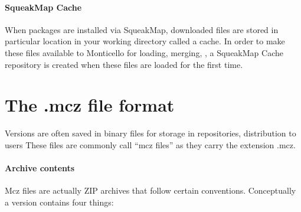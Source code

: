 \documentclass[a4paper,10pt,twoside]{book}
\begin{document}
\paragraph{SqueakMap Cache} When packages are installed via SqueakMap, downloaded files are stored in particular location  in your working directory called a cache. In order to make these files available to Monticello for loading, merging, \etc, a SqueakMap Cache repository is created when these files are loaded for the first time.





\section{The .mcz file format}

Versions are often  saved in binary files for storage in repositories, distribution to users \etc
These files are commonly call ``mcz files'' as they carry the extension .mcz.

\paragraph{Archive contents}

Mcz files are actually ZIP archives that follow certain conventions. Conceptually a version contains four things:
\end{document}
